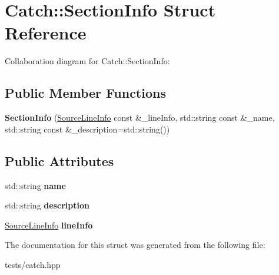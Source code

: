 \hypertarget{struct_catch_1_1_section_info}{}\section{Catch\+:\+:Section\+Info Struct Reference}
\label{struct_catch_1_1_section_info}


Collaboration diagram for Catch\+:\+:Section\+Info\+:
\subsection*{Public Member Functions}
\begin{DoxyCompactItemize}
\item 
\mbox{\label{struct_catch_1_1_section_info_a27aff3aaf8b6611f3651b17111a272c6}} 
{\bfseries Section\+Info} (\hyperlink{struct_catch_1_1_source_line_info}{Source\+Line\+Info} const \&\+\_\+line\+Info, std\+::string const \&\+\_\+name, std\+::string const \&\+\_\+description=std\+::string())
\end{DoxyCompactItemize}
\subsection*{Public Attributes}
\begin{DoxyCompactItemize}
\item 
\mbox{\label{struct_catch_1_1_section_info_a704c8fc662d309137e0d4f199cb7df58}} 
std\+::string {\bfseries name}
\item 
\mbox{\label{struct_catch_1_1_section_info_a0052060219a6de74bb7ade34d4163a4e}} 
std\+::string {\bfseries description}
\item 
\mbox{\label{struct_catch_1_1_section_info_adbc83b8a3507c4acc8ee249e93465711}} 
\hyperlink{struct_catch_1_1_source_line_info}{Source\+Line\+Info} {\bfseries line\+Info}
\end{DoxyCompactItemize}


The documentation for this struct was generated from the following file\+:\begin{DoxyCompactItemize}
\item 
tests/catch.\+hpp\end{DoxyCompactItemize}
